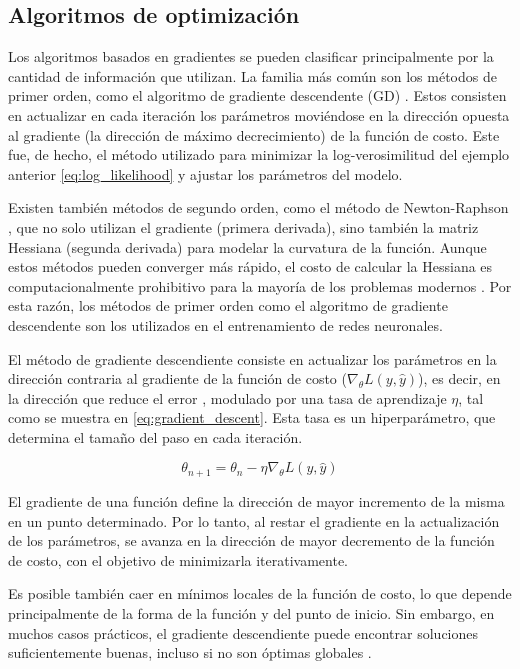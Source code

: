 \subsection{Algoritmos de optimización}
\label{sec:algoritmos_de_optimizacion}

Los algoritmos basados en gradientes se pueden clasificar principalmente por la cantidad de información que utilizan. La familia más común son los métodos de primer orden, como el algoritmo de gradiente descendente (GD) \cite{Cauchy1847}. Estos consisten en actualizar en cada iteración los parámetros moviéndose en la dirección opuesta al gradiente (la dirección de máximo decrecimiento) de la función de costo. Este fue, de hecho, el método utilizado para minimizar la log-verosimilitud del ejemplo anterior \eqref{eq:log_likelihood} y ajustar los parámetros del modelo.

Existen también métodos de segundo orden, como el método de Newton-Raphson \cite{Nocedal2006}, que no solo utilizan el gradiente (primera derivada), sino también la matriz Hessiana (segunda derivada) para modelar la curvatura de la función. Aunque estos métodos pueden converger más rápido, el costo de calcular la Hessiana es computacionalmente prohibitivo para la mayoría de los problemas modernos \cite{Goodfellow2016}. Por esta razón, los métodos de primer orden como el algoritmo de gradiente descendente son los utilizados en el entrenamiento de redes neuronales.

El método de gradiente descendiente consiste en actualizar los parámetros en la dirección contraria al gradiente de la función de costo ($\nabla_{\theta} L(y, \hat{y})$), es decir, en la dirección que reduce el error \cite{Cauchy1847}, modulado por una tasa de aprendizaje $\eta$, tal como se muestra en \eqref{eq:gradient_descent}. Esta tasa es un hiperparámetro, que determina el tamaño del paso en cada iteración.

\begin{equation}
    \label{eq:gradient_descent}
    \theta_{n+1} = \theta_n - \eta \nabla_{\theta} L(y, \hat{y})
\end{equation}

El gradiente de una función define la dirección de mayor incremento de la misma en un punto determinado. Por lo tanto, al restar el gradiente en la actualización de los parámetros, se avanza en la dirección de mayor decremento de la función de costo, con el objetivo de minimizarla iterativamente.

Es posible también caer en mínimos locales de la función de costo, lo que depende principalmente de la forma de la función y del punto de inicio. Sin embargo, en muchos casos prácticos, el gradiente descendiente puede encontrar soluciones suficientemente buenas, incluso si no son óptimas globales \cite{Bishop2006}.

